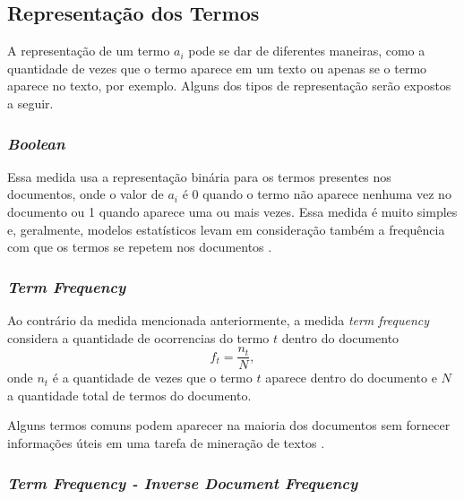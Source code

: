 \subsection{Representação dos Termos}
\label{sec:representação_dos_termos}

A representação de um termo \(a_i\) pode se dar de diferentes maneiras, como a quantidade de vezes que o termo aparece em um texto ou apenas se o termo aparece no texto, por exemplo. Alguns dos tipos de representação serão expostos a seguir.

\subsubsection{\textit{Boolean}}
\label{ssub:bag-boolean}

Essa medida usa a representação binária para os termos presentes nos documentos, onde o valor de \(a_{i}\) é 0 quando o termo não aparece nenhuma vez no documento ou 1 quando aparece uma ou mais vezes. Essa medida é muito simples e, geralmente, modelos estatísticos levam em consideração também a frequência com que os termos se repetem nos documentos \cite{buckley1988}.

\subsubsection{\textit{Term Frequency}}
\label{ssub:baf-tf}

Ao contrário da medida mencionada anteriormente, a medida \textit{term frequency} considera a quantidade de ocorrencias do termo \(t\) dentro do documento
%
\begin{equation}
f_t=\frac{n_t}{N},
\end{equation}
%
onde \(n_t\) é a quantidade de vezes que o termo \(t\) aparece dentro do documento e \(N\) a quantidade total de termos do documento.

Alguns termos comuns podem aparecer na maioria dos documentos sem fornecer informações úteis em uma tarefa de mineração de textos \cite{pretext}.

\subsubsection{\textit{Term Frequency - Inverse Document Frequency}}
\label{ssub:baf-tfidf}

